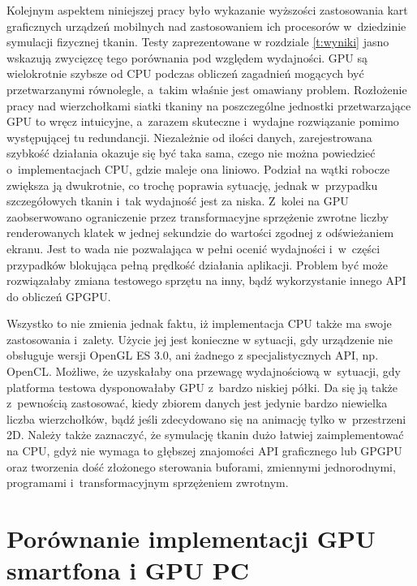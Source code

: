 	
	Kolejnym aspektem niniejszej pracy było wykazanie wyższości zastosowania kart graficznych urządzeń mobilnych nad zastosowaniem ich procesorów w~dziedzinie symulacji fizycznej tkanin. Testy zaprezentowane w rozdziale \ref{t:wyniki} jasno wskazują zwycięzcę tego porównania pod względem wydajności. GPU są wielokrotnie szybsze od CPU podczas obliczeń zagadnień mogących być przetwarzanymi równolegle, a~takim właśnie jest omawiany problem. Rozłożenie pracy nad wierzchołkami siatki tkaniny na poszczególne jednostki przetwarzające GPU to wręcz intuicyjne, a~zarazem skuteczne i~wydajne rozwiązanie pomimo występującej tu redundancji. Niezależnie od ilości danych, zarejestrowana szybkość działania okazuje się być taka sama, czego nie można powiedzieć o~implementacjach CPU, gdzie maleje ona liniowo. Podział na wątki robocze zwiększa ją dwukrotnie, co trochę poprawia sytuację, jednak w~przypadku szczegółowych tkanin i~tak wydajność jest za niska. Z~kolei na GPU zaobserwowano ograniczenie przez transformacyjne sprzężenie zwrotne liczby renderowanych klatek w jednej sekundzie do wartości zgodnej z odświeżaniem ekranu. Jest to wada nie pozwalająca w pełni ocenić wydajności i~w~części przypadków blokująca pełną prędkość działania aplikacji. Problem być może rozwiązałaby zmiana testowego sprzętu na inny, bądź wykorzystanie innego API do obliczeń GPGPU.
	
	Wszystko to nie zmienia jednak faktu, iż implementacja CPU także ma swoje zastosowania i~zalety. Użycie jej jest konieczne w sytuacji, gdy urządzenie nie obsługuje wersji OpenGL ES 3.0, ani żadnego z specjalistycznych API, np. OpenCL. Możliwe, że uzyskałaby ona przewagę wydajnościową w~sytuacji, gdy platforma testowa dysponowałaby GPU z~bardzo niskiej półki. Da się ją także z~pewnością zastosować, kiedy zbiorem danych jest jedynie bardzo niewielka liczba wierzchołków, bądź jeśli zdecydowano się na animację tylko w~przestrzeni 2D. Należy także zaznaczyć, że symulację tkanin dużo łatwiej zaimplementować na CPU, gdyż nie wymaga to głębszej znajomości API graficznego lub GPGPU oraz tworzenia dość złożonego sterowania buforami, zmiennymi jednorodnymi, programami i~transformacyjnym sprzężeniem zwrotnym.
	
	\section{Porównanie implementacji GPU smartfona i GPU PC}
	\label{t:wnioski:andro_vs_pc}
	
